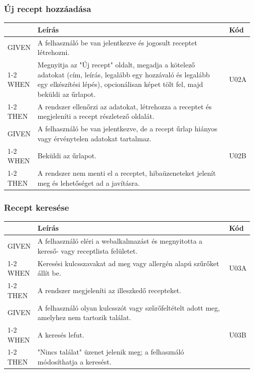 \subsubsection{Új recept hozzáadása}
\begin{table}[H]
	\centering
	\begin{tabular}{|m{0.12\linewidth}|m{0.78\linewidth}|m{0.08\linewidth}|}
		\hline
		& \textbf{Leírás} & \textbf{Kód} \\\hline
		GIVEN & A felhasználó be van jelentkezve és jogosult receptet létrehozni. & \multirow{3}{*}{U02A} \\\cline{1-2}
		WHEN  & Megnyitja az "Új recept" oldalt, megadja a kötelező adatokat (cím, leírás, legalább egy hozzávaló és legalább egy elkészítési lépés), opcionálisan képet tölt fel, majd beküldi az űrlapot. & \\\cline{1-2}
		THEN  & A rendszer ellenőrzi az adatokat, létrehozza a receptet és megjeleníti a recept részletező oldalát. & \\\hline

		GIVEN & A felhasználó be van jelentkezve, de a recept űrlap hiányos vagy érvénytelen adatokat tartalmaz. & \multirow{3}{*}{U02B} \\\cline{1-2}
		WHEN  & Beküldi az űrlapot. & \\\cline{1-2}
		THEN  & A rendszer nem menti el a receptet, hibaüzeneteket jelenít meg és lehetőséget ad a javításra. & \\\hline
	\end{tabular}
\end{table}

\subsubsection{Recept keresése}
\begin{table}[H]
	\centering
	\begin{tabular}{|m{0.12\linewidth}|m{0.78\linewidth}|m{0.08\linewidth}|}
		\hline
		& \textbf{Leírás} & \textbf{Kód} \\\hline
		GIVEN & A felhasználó eléri a webalkalmazást és megnyitotta a kereső- vagy receptlista felületet. & \multirow{3}{*}{U03A} \\\cline{1-2}
		WHEN  & Keresési kulcsszavakat ad meg vagy allergén alapú szűrőket állít be. & \\\cline{1-2}
		THEN  & A rendszer megjeleníti az illeszkedő recepteket. & \\\hline

		GIVEN & A felhasználó olyan kulcsszót vagy szűrőfeltételt adott meg, amelyhez nem tartozik találat. & \multirow{3}{*}{U03B} \\\cline{1-2}
		WHEN  & A keresés lefut. & \\\cline{1-2}
		THEN  & "Nincs találat" üzenet jelenik meg; a felhasználó módosíthatja a keresést. & \\\hline
\end{tabular}
\end{table}

